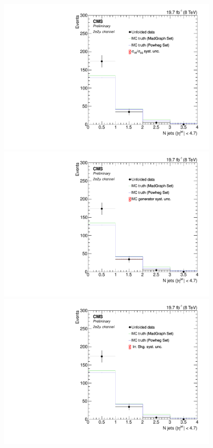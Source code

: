 \begin{figure}[hbtp]
  \begin{center}
    \includegraphics[width=0.8\cmsFigWidth]{Figures/Unfolding/Systematics/ZZTo2e2m_Jets_qqgg_Mad_fr}     
    \includegraphics[width=0.8\cmsFigWidth]{Figures/Unfolding/Systematics/ZZTo2e2m_Jets_MCgen_Mad_fr}     
    \includegraphics[width=0.8\cmsFigWidth]{Figures/Unfolding/Systematics/ZZTo2e2m_Jets_IrrBkg_Mad_fr}

\end{center}
\end{figure}
